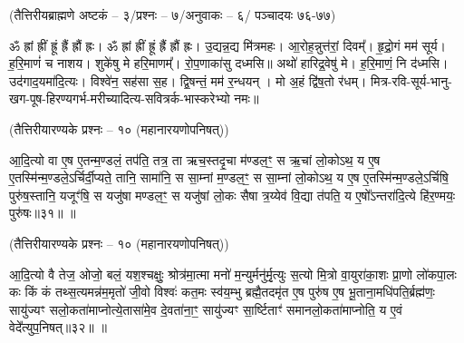 \centerline{\normalsize (तैत्तिरीयब्राह्मणे अष्टकं – ३/प्रश्नः – ७/अनुवाकः – ६/ पञ्चादयः ७६-७७)}

ॐ ह्रां ह्रीं ह्रूं ह्रैं ह्रौं ह्रः। ॐ ह्रां ह्रीं ह्रूं ह्रैं ह्रौं ह्रः। 
उ॒द्यन्न॒द्य मि॑त्रमहः। 
आ॒रोह॒न्नुत्त॑रां॒ दिवम्᳚।
हृ॒द्रो॒गं मम॑ सूर्य।
ह॒रि॒माणं॑ च नाशय।
शुके॑षु मे हरि॒माणम्᳚।
रो॒प॒णाका॑सु दध्मसि॥
अथो॑ हारिद्र॒वेषु॑ मे।
ह॒रि॒माणं॒ नि द॑ध्मसि।
उद॑गाद॒यमा॑दि॒त्यः।
विश्वे॑न॒ सह॑सा स॒ह।
द्वि॒षन्तं॒ मम॑ र॒न्धयन्।
मो अ॒हं द्वि॑ष॒तो र॑धम्।
मित्र-रवि-सूर्य-भानु-खग-पूष-हिरण्यगर्भ-मरीच्यादित्य-सवित्रर्क-भास्करेभ्यो नमः॥

\centerline{\normalsize (तैत्तिरीयारण्यके प्रश्नः – १० (महानारयणोपनिषत्))}
आ॒दि॒त्यो वा ए॒ष ए॒तन्म॒ण्डलं॒ तप॑ति॒ तत्र॒ ता ऋच॒स्तदृ॒चा म॑ण्डल॒ꣳ॒ स ऋ॒चां लो॒कोऽथ॒ य ए॒ष ए॒तस्मि॑न्म॒ण्डले॒ऽर्चिर्दी॒प्यते॒ तानि॒ सामा॑नि॒ स सा॒म्नां म॒ण्डल॒ꣳ॒ स सा॒म्नां लो॒कोऽथ॒ य ए॒ष ए॒तस्मि॑न्म॒ण्डले॒ऽर्चिषि॒ पुरु॑ष॒स्तानि॒ यजूꣳ॑षि॒ स यजु॑षा मण्डल॒ꣳ॒ स यजु॑षां लो॒कः सैषा त्र॒य्येव॑ वि॒द्या त॑पति॒ य ए॒षो᳚ऽन्तरा॑दि॒त्ये हि॑र॒ण्मयः॒ पुरु॑षः॥३१॥
\devAya{}॥


\centerline{\normalsize (तैत्तिरीयारण्यके प्रश्नः – १० (महानारयणोपनिषत्))}
आ॒दि॒त्यो वै तेज॒ ओजो॒ बलं॒ यश॒श्चक्षुः॒ श्रोत्र॑मा॒त्मा मनो॑ म॒न्युर्मनु॑र्मृ॒त्युः स॒त्यो मि॒त्रो वा॒युरा॑का॒शः प्रा॒णो लो॑कपा॒लः कः किं कं तथ्स॒त्यमन्न॑म॒मृतो॑ जी॒वो विश्वः॑ कत॒मः स्व॑य॒म्भु ब्रह्मै॒तदमृ॑त ए॒ष पुरु॑ष ए॒ष भू॒ताना॒मधि॑पति॒र्ब्रह्म॑णः॒ सायु॑ज्यꣳ सलो॒कता॑माप्नोत्ये॒तासा॑मे॒व दे॒वता॑ना॒ꣳ॒ सायु॑ज्यꣳ सा॒र्ष्टिताꣳ॑ समानलो॒कता॑माप्नोति॒ य ए॒वं वेदे᳚त्युप॒निषत्॥३२॥
\devAya{}॥

\begingroup
\setlength{\parindent}{1.5em}
\makeatletter
  \def\vhrulefill#1{\leavevmode\leaders\hrule\@height#1\hfill \kern\z@}
\makeatother
\newcommand{\anuvakamend}[1][]{\refstepcounter{anuvakam}%
\newline\centerline{\devAya{}।}
\centerline{\textbf{ॐ नमो नारायणाय॥}}
\newline\mbox{}
\baselineskip=12pt\nolinebreak[4]\vhrulefill{1.6pt}\raisebox{-3pt}{\bfseries{[\devanumber{\arabic{anuvakam}}]}}%
\vspace{-1pt}
}
\renewcommand{\sect}[1]{}

\endgroup
\begingroup
\let\chapt\sect

\endgroup


